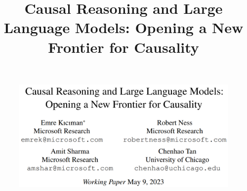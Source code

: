 \documentclass{beamer}
\begin{document}
\title[]{Causal Reasoning and Large Language Models: Opening a New Frontier for Causality}
\author {}
\date{}

\begin{frame}
	\begin{figure}
		\centering
		\includegraphics[scale=0.4]{imgs/title.png}
	\end{figure}
\end{frame}


\end{document}
